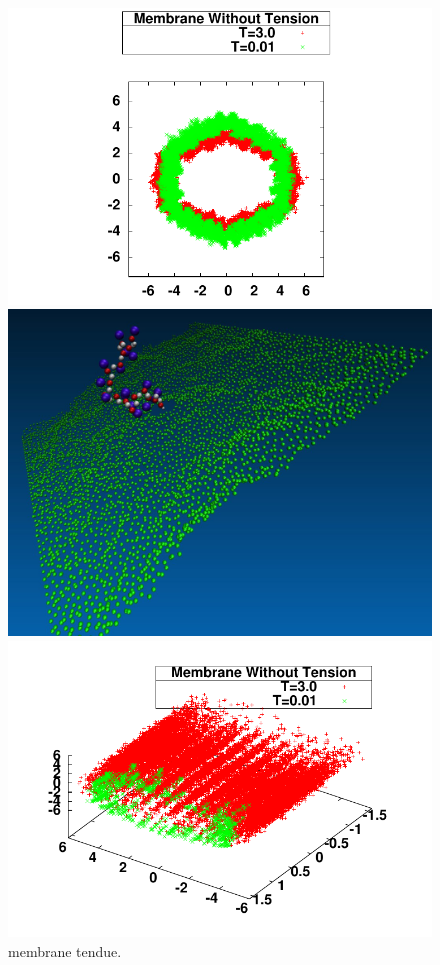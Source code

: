 \begin{figure}[H]
\begin{center}
\begin{minipage}{0.7\linewidth}
\includegraphics[width=1.2\textwidth]{2dnomembranetension.pdf} 
\end{minipage}
\begin{minipage}{0.29\linewidth}
\includegraphics[width=1.1\textwidth]{membranenontendue.jpg}
\end{minipage}
\includegraphics[width=\textwidth]{3dnomembranetension.pdf}  
\caption[Membrane non tendue]{membrane tendue.}


\end{center}
\end{figure}
